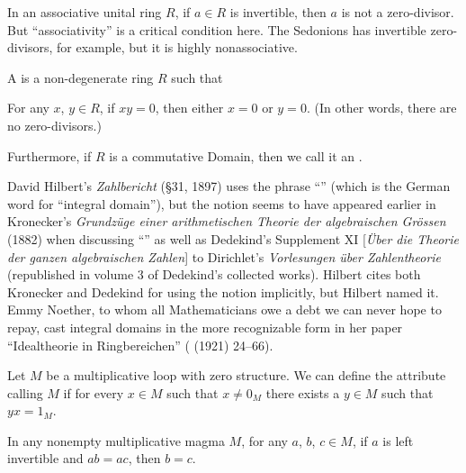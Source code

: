 \begin{remark}
In an associative unital ring $R$, if $a\in R$ is invertible, then $a$
is not a zero-divisor. But ``associativity'' is a critical condition
here. The Sedonions has invertible zero-divisors, for example, but it
is highly nonassociative.
\end{remark}

\begin{definition}
A  is a non-degenerate ring $R$ such that
\begin{itemize}
 For any $x$, $y\in R$, if $xy=0$,
then either $x=0$ or $y=0$. (In other words, there are no zero-divisors.)
\end{itemize}
Furthermore, if $R$ is a commutative Domain, then we call it an
.
\end{definition}

\begin{remark}
David Hilbert's \emph{Zahlbericht} (\S31, 1897) uses the phrase ``''
(which is the German word for ``integral domain''), but the notion
seems to have appeared earlier in Kronecker's \emph{Grundz\"{u}ge einer arithmetischen Theorie der algebraischen Gr\"{o}ssen}
(1882) when discussing ``'' as well
as Dedekind's Supplement XI [\emph{\"{U}ber die Theorie der ganzen algebraischen Zahlen}] to Dirichlet's \emph{Vorlesungen \"{u}ber Zahlentheorie}
(republished in volume 3 of Dedekind's collected works). Hilbert cites
both Kronecker and Dedekind for using the notion implicitly, but
Hilbert named it. Emmy Noether, to whom all Mathematicians owe a debt
we can never hope to repay, cast integral domains in the more
recognizable form in her paper ``Idealtheorie in Ringbereichen''
(  (1921) 24--66).
\end{remark}

\begin{definition}
Let $M$ be a multiplicative loop with zero structure.
We can define the attribute calling $M$  
if for every $x\in M$ such that $x\neq 0_{M}$ there exists a $y\in M$
such that $yx=1_{M}$.
\end{definition}

\begin{proposition}
In any nonempty multiplicative magma $M$,
for any $a$, $b$, $c\in M$, if $a$ is left invertible and $ab=ac$,
then $b=c$.
\end{proposition}

